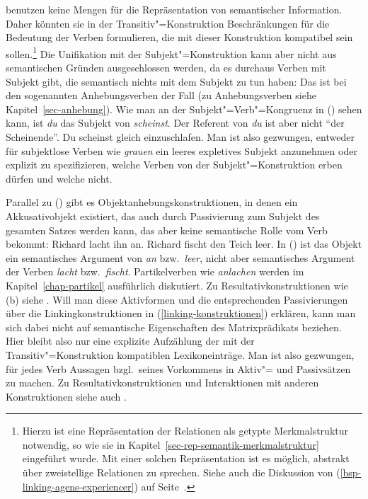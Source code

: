 \citet{MR2001a} benutzen keine Mengen für die Repräsentation von semantischer Information.
Daher könnten sie in der Transitiv"=Konstruktion Beschränkungen für die Bedeutung der Verben
formulieren, die mit dieser Konstruktion kompatibel sein sollen.\footnote{
  Hierzu ist eine Repräsentation der Relationen als getypte Merkmalstruktur notwendig, so
  wie sie in Kapitel~\ref{sec-rep-semantik-merkmalstruktur} eingeführt wurde. Mit einer solchen
  Repräsentation ist es möglich, abstrakt über zweistellige Relationen zu sprechen. 
  Siehe \zb auch die Diskussion von (\ref{bsp-linking-agens-experiencer}) auf
  Seite~\pageref{bsp-linking-agens-experiencer}.%
}
Die Unifikation mit der Subjekt"=Konstruktion kann aber nicht aus semantischen Gründen ausgeschlossen
werden, da es durchaus Verben mit Subjekt gibt, die semantisch nichts mit dem Subjekt zu tun haben:
Das ist bei den sogenannten Anhebungsverben der Fall (zu Anhebungsverben
siehe Kapitel~\ref{sec-anhebung}). Wie man an der Subjekt"=Verb"=Kongruenz in ()
sehen kann, ist \emph{du} das Subjekt von \emph{scheinst}. Der Referent von \emph{du} ist aber nicht
"`der Scheinende"'.
\ea
Du scheinst gleich einzuschlafen.
\z
Man ist also gezwungen, entweder für subjektlose Verben wie \emph{grauen} ein leeres expletives
Subjekt anzunehmen oder explizit zu spezifizieren, welche Verben von der Subjekt"=Konstruktion
erben dürfen und welche nicht.


Parallel zu () gibt es Objektanhebungskonstruktionen, in denen ein Akkusativobjekt
existiert, das auch durch Passivierung zum Subjekt des gesamten Satzes werden kann, das
aber keine semantische Rolle vom Verb bekommt:
\eal
\ex Richard lacht ihn an.
\ex Richard fischt den Teich leer.
\zl
In () ist das Objekt ein semantisches Argument von \emph{an} bzw.\ \emph{leer}, nicht aber
semantisches Argument der Verben \emph{lacht} bzw.\ \emph{fischt}.
Partikelverben wie \emph{anlachen} werden im Kapitel~\ref{chap-partikel} ausführlich diskutiert.
Zu Resultativkonstruktionen wie (b)  siehe .
Will man diese Aktivformen und die entsprechenden Passivierungen über die Linkingkonstruktionen
in (\ref{linking-konstruktionen}) erklären, kann man sich dabei nicht auf semantische Eigenschaften
des Matrixprädikats beziehen. Hier bleibt also nur eine explizite Aufzählung der mit
der Transitiv"=Konstruktion kompatiblen Lexikoneinträge. Man ist also gezwungen, für jedes Verb
Aussagen bzgl.\ seines Vorkommens in Aktiv"= und Passivsätzen zu machen.
Zu Resultativkonstruktionen und
Interaktionen mit anderen Konstruktionen siehe auch .


